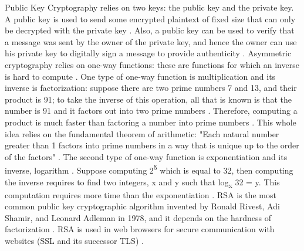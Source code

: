 \documentclass{l4proj}
\begin{document}
Public Key Cryptography relies on two keys: the public key and the private key. 
A public key is used to send some encrypted plaintext of fixed size that can only be decrypted with the private key \citep{savage_cse_2019}. 
Also, a public key can be used to verify that a message was sent by the owner of the private key, 
and hence the owner can use his private key to digitally sign a message to provide authenticity \citep{savage_cse_2019}.
Asymmetric cryptography relies on one-way functions: these are functions for which an inverse is hard to compute \citep{kessler_overview_2016}.
One type of one-way function is multiplication and its inverse is factorization: suppose there are two prime numbers 7 and 13, and their product is 91; 
to take the inverse of this operation, all that is known is that the number is 91 and it factors out into two prime numbers \citep{kessler_overview_2016}.
Therefore, computing a product is much faster than factoring a number into prime numbers \citep{kessler_overview_2016}. 
This whole idea relies on the fundamental theorem of arithmetic: 
"Each natural number greater than 1 factors into prime numbers in a way that is unique up to the order of the factors" \citep{anderson_security_2008}.
The second type of one-way function is exponentiation and its inverse, logarithm \citep{kessler_overview_2016}. Suppose computing 2\textsuperscript{5} which is equal
to 32, then computing the inverse requires to find two integers, x and y such that log\textsubscript{x} 32 = y. This computation requires more time than the exponentiation \citep{kessler_overview_2016}.
RSA is the most common public key cryptographic algorithm invented by Ronald Rivest, Adi Shamir, and Leonard Adleman in 1978, 
and it depends on the hardness of factorization \citep{kessler_overview_2016} \citep{savage_cse_2019}.
RSA is used in web browsers for secure communication with websites (SSL and its successor TLS) \citep{anderson_security_2008}.
\end{document}
